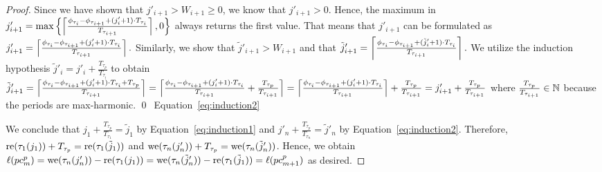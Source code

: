 \documentclass[10pt,conference]{resources/IEEEtran}
\theoremstyle{definition}
\newcommand{\pc}{{pc}}
\begin{document}
\begin{proof}
	Since we have shown that $j'_{i+1} > W_{i+1} \geq 0$, we know that $j'_{i+1}>0$.
	Hence, the maximum in $j'_{i+1} = \max\left\{{\left\lceil{\frac{\phi_{\tau_i} - \phi_{\tau_{i+1}} + (j'_i+1) \cdot T_{\tau_i}}{T_{\tau_{i+1}}}}\right\rceil , 0}\right\}$ always returns the first value. 
	That means that $j'_{i+1}$ can be formulated as
	\begin{math}
		j'_{i+1} = \left\lceil{\frac{\phi_{\tau_i} - \phi_{\tau_{i+1}} + (j'_i+1) \cdot T_{\tau_i}}{T_{\tau_{i+1}}}}\right\rceil.
	\end{math}
	Similarly, we show that $\tilde{j}'_{i+1} > W_{i+1}$ and that 
	\begin{math}
		\tilde{j}'_{i+1} = \left\lceil{\frac{\phi_{\tau_i} - \phi_{\tau_{i+1}} + (\tilde{j}'_i+1) \cdot T_{\tau_i}}{T_{\tau_{i+1}}}}\right\rceil.
	\end{math}
	We utilize the induction hypothesis $\tilde{j}'_i = j'_i + \frac{T_{\tau_p}}{T_{\tau_i}}$ to obtain
	\begin{math}
		\tilde{j}'_{i+1} 
		= \left\lceil{\frac{\phi_{\tau_i} - \phi_{\tau_{i+1}} + (j'_i +1) \cdot T_{\tau_i} + T_{\tau_p}}{T_{\tau_{i+1}}}}\right\rceil
		= \left\lceil{\frac{\phi_{\tau_i} - \phi_{\tau_{i+1}} + (j'_i +1) \cdot T_{\tau_i}}{T_{\tau_{i+1}}} + \frac{T_{\tau_p}}{T_{\tau_{i+1}}}}\right\rceil
		= \left\lceil{\frac{\phi_{\tau_i} - \phi_{\tau_{i+1}} + (j'_i +1) \cdot T_{\tau_i}}{T_{\tau_{i+1}}}}\right\rceil + \frac{T_{\tau_p}}{T_{\tau_{i+1}}}
		= j'_{i+1} + \frac{T_{\tau_p}}{T_{\tau_{i+1}}}
	\end{math}
	where $\frac{T_{\tau_p}}{T_{\tau_{i+1}}} \in \mathbb{N}$ because the periods are max-harmonic.
	\qed~Equation~\eqref{eq:induction2}

	We conclude that $j_1 + \frac{T_{\tau_p}}{T_{\tau_1}} = \tilde{j}_1$ by Equation~\eqref{eq:induction1} and $j'_n + \frac{T_{\tau_p}}{T_{\tau_n}} = \tilde{j}'_n$ by Equation~\eqref{eq:induction2}.
	Therefore, $\operatorname{re}(\tau_1(j_1)) + T_{\tau_p} = \operatorname{re}(\tau_1(\tilde{j}_1))$ and $\operatorname{we}(\tau_n(j'_n)) + T_{\tau_p} = \operatorname{we}(\tau_n(\tilde{j}'_n))$.
	Hence, we obtain%
	\begin{math}
		\ell(\pc^p_m) = \we(\tau_n(j'_n)) - \re(\tau_1(j_1)) 
		= \we(\tau_n(\tilde{j}'_n)) - \re(\tau_1(\tilde{j}_1)) 
		= \ell(\pc^p_{m+1})
	\end{math}
	as desired.
\end{proof}


\label{last-page}
\clearpage


	
\end{document}
